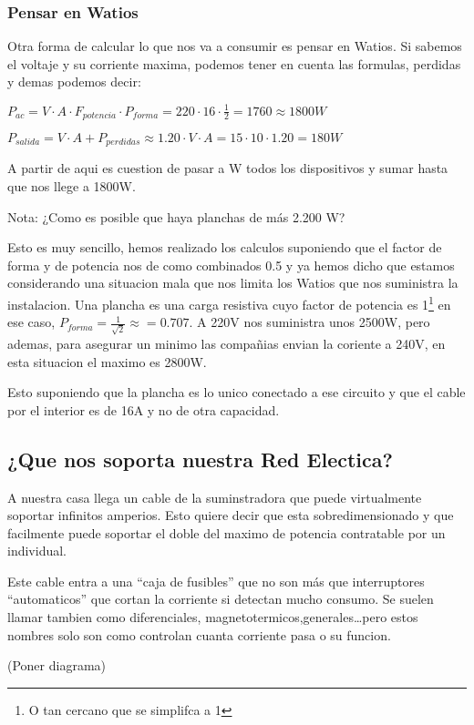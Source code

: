 \subsubsection{Pensar en Watios}

Otra forma de calcular lo que nos va a consumir es pensar en Watios. Si sabemos el voltaje y su corriente maxima, podemos tener en cuenta las formulas, perdidas y demas podemos decir:

$P_{ac}=V\cdot A \cdot F_{potencia}\cdot P_{forma}=220 \cdot 16 \cdot \frac{1}{2} = 1760 \approx 1800W$

$P_{salida}= V\cdot A +P_{perdidas}\approx 1.20\cdot V\cdot A =15 \cdot 10 \cdot 1.20=180W$

A partir de aqui es cuestion de pasar a W todos los dispositivos y sumar hasta que nos llege a 1800W.

Nota: ¿Como es posible que haya planchas de más 2.200 W? 

Esto es muy sencillo, hemos realizado los calculos suponiendo que el factor de forma y de potencia nos de como combinados 0.5 y ya hemos dicho que estamos considerando una situacion mala que nos limita los Watios que nos suministra la instalacion. Una plancha es una carga resistiva cuyo factor de potencia es 1\footnote{O tan cercano que se simplifca a 1} en ese caso, $P_{forma}=\frac{1}{\sqrt{2}}\approx=0.707$. A 220V nos suministra unos 2500W, pero ademas, para asegurar un minimo las compañias envian la coriente a 240V, en esta situacion el maximo es 2800W.

Esto suponiendo que la plancha es lo unico conectado a ese circuito y que el cable por el interior es de 16A y no de otra capacidad.


\subsection{¿Que nos soporta nuestra Red Electica?}
A nuestra casa llega un cable de la suminstradora que puede virtualmente soportar infinitos amperios. Esto quiere decir que esta sobredimensionado y que facilmente puede soportar el doble del maximo de potencia contratable por un individual.

Este cable entra a una ``caja de fusibles'' que no son más que interruptores ``automaticos'' que cortan la corriente si detectan mucho consumo.
Se suelen llamar tambien como diferenciales, magnetotermicos,generales\dots pero estos nombres solo son como controlan cuanta corriente pasa o su funcion.

(Poner diagrama)

